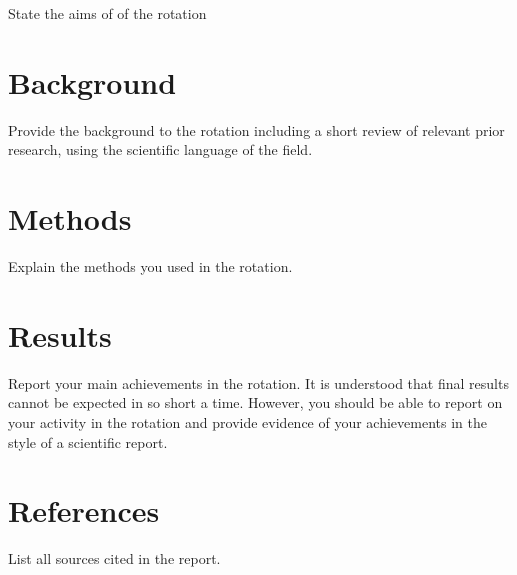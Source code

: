 \documentclass[paper=a4wide, fontsize=12pt]{scrartcl}	 %
\begin{document}
State the aims of of the rotation

\section*{Background}

Provide the background to the rotation including a short review of relevant prior research, using the scientific language of the field.

\section*{Methods}

Explain the methods you used in the rotation.


\section*{Results}

Report your main achievements in the rotation. It is understood that final results cannot be expected in so short a time. However, you should be able to report on your activity in the rotation and provide evidence of your achievements in the style of a scientific report.


\section*{References}

List all sources cited in the report.
\end{document}
